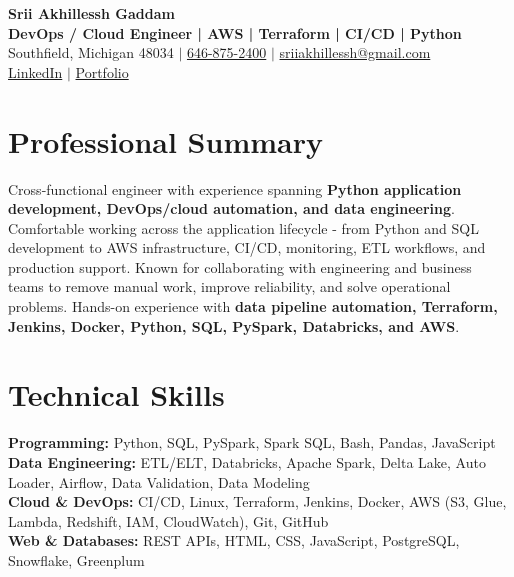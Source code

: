 \documentclass[letterpaper,10pt]{article}
\begin{document}
\fontsize{9.35pt}{10.45pt}\selectfont

\begin{center}
    {\LARGE \textbf{Srii Akhillessh Gaddam}} \\[-1pt]
    \textbf{DevOps / Cloud Engineer | AWS | Terraform | CI/CD | Python} \\[2pt]
    Southfield, Michigan 48034 $|$
    \href{tel:6468752400}{646-875-2400} $|$
    \href{mailto:sriiakhillessh@gmail.com}{sriiakhillessh@gmail.com} \\[1pt]
    \href{https://www.linkedin.com/in/srii-akhiilessh-gaddam-b48668191/}{LinkedIn} $|$
    \href{https://sriiakhillesshg.github.io/portfolio/}{Portfolio}
\end{center}
\vspace{-8pt}

\section{Professional Summary}
\small{Cross-functional engineer with experience spanning \textbf{Python application development, DevOps/cloud automation, and data engineering}. Comfortable working across the application lifecycle - from Python and SQL development to AWS infrastructure, CI/CD, monitoring, ETL workflows, and production support. Known for collaborating with engineering and business teams to remove manual work, improve reliability, and solve operational problems. Hands-on experience with \textbf{data pipeline automation, Terraform, Jenkins, Docker, Python, SQL, PySpark, Databricks, and AWS}.}

\section{Technical Skills}
\small{
\textbf{Programming:} Python, SQL, PySpark, Spark SQL, Bash, Pandas, JavaScript \\
\textbf{Data Engineering:} ETL/ELT, Databricks, Apache Spark, Delta Lake, Auto Loader, Airflow, Data Validation, Data Modeling \\
\textbf{Cloud \& DevOps:} CI/CD, Linux, Terraform, Jenkins, Docker, AWS (S3, Glue, Lambda, Redshift, IAM, CloudWatch), Git, GitHub \\
\textbf{Web \& Databases:} REST APIs, HTML, CSS, JavaScript, PostgreSQL, Snowflake, Greenplum
}
\end{document}
